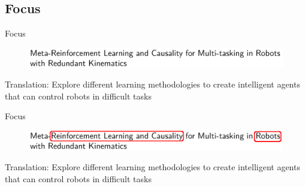 \subsection{Focus}

\begin{frame}{Focus}
  \begin{figure}
    \centering
    \includegraphics[width=\textwidth]{img/title.png}
  \end{figure}
  \pause
  Translation: Explore different learning methodologies to create intelligent agents that can control robots in difficult tasks
\end{frame}
\begin{frame}{Focus}
  \begin{figure}
    \centering
    \includegraphics[width=\textwidth]{img/title_annotated.png}
  \end{figure}
  Translation: Explore different learning methodologies to create intelligent agents that can control robots in difficult tasks
\end{frame}
